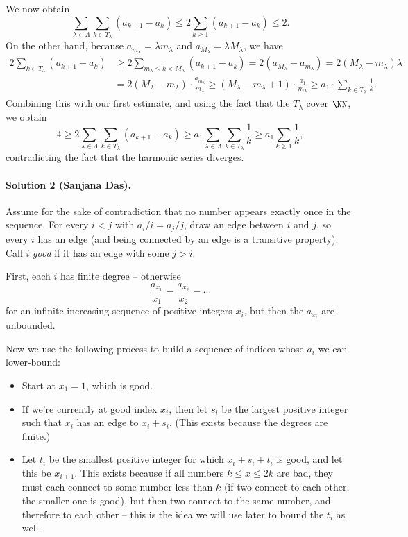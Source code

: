\documentclass[11pt]{scrartcl}
\begin{document}
We now obtain
\[
\sum_{\lambda \in \Lambda} \sum_{k \in T_\lambda} (a_{k+1}-a_k) \le 2 \sum_{k \ge 1} (a_{k+1} - a_k) \le 2.
\]
On the other hand,  because $a_{m_\lambda} = \lambda m_\lambda$ and $a_{M_\lambda} = \lambda M_\lambda$, we have
\begin{align*}
  2\sum_{k \in T_\lambda} (a_{k+1} - a_k) &\ge2 \sum_{m_\lambda \le k < M_\lambda}
  (a_{k+1} - a_k) = 2(a_{M_\lambda}-a_{m_\lambda}) = 2(M_\lambda-m_\lambda)\lambda
                                        \\
                                          & = 2(M_\lambda - m_\lambda) \cdot
                                        \frac{a_{m_\lambda}}{m_\lambda} \ge
                                        (M_\lambda - m_\lambda + 1) \cdot
                                        \frac{a_1}{m_\lambda} \ge a_1 \cdot
                                        \sum_{k \in T_\lambda} \frac1k.
\end{align*}
Combining this with our first estimate, and using the fact that the $T_\lambda$ cover $\NN$,  we obtain
\[
4 \ge 2 \sum_{\lambda \in \Lambda} \sum_{k \in T_\lambda} (a_{k+1}-a_k) \ge a_1 \sum_{\lambda \in \Lambda} \sum_{k \in T_\lambda} \frac1k \ge a_1 \sum_{k \ge 1} \frac1k,
\]
contradicting the fact that the harmonic series diverges.

\paragraph{Solution 2 (Sanjana Das).}

Assume for the sake of contradiction that no number appears exactly once in the
sequence. For every $i < j$ with $a_i/i = a_j/j$, draw an edge
between $i$ and $j$, so every $i$ has an edge (and being connected by an edge is
a transitive property). Call $i$ \emph{good} if it has an edge with some $j > i$.

First, each $i$ has finite degree -- otherwise \[\frac{a_{x_1}}{x_1} = \frac{a_{x_2}}{x_2} = \dotsb\] for an infinite increasing sequence of positive integers $x_i$, but then the $a_{x_i}$ are unbounded.

Now we use the following process to build a sequence of indices whose $a_i$ we can lower-bound:
\begin{itemize}
    \item Start at $x_1 = 1$, which is good.
    \item If we're currently at good index $x_i$, then let $s_i$ be the largest positive integer such that $x_i$ has an edge to $x_i + s_i$. (This exists because the degrees are finite.)
    \item Let $t_i$ be the smallest positive integer for which $x_i + s_i + t_i$ is good, and let this be $x_{i + 1}$. This exists because if all numbers $k \leq x \leq 2k$ are bad, they must each connect to some number less than $k$ (if two connect to each other, the smaller one is good), but then two connect to the same number, and therefore to each other -- this is the idea we will use later to bound the $t_i$ as well.
\end{itemize}
\end{document}
